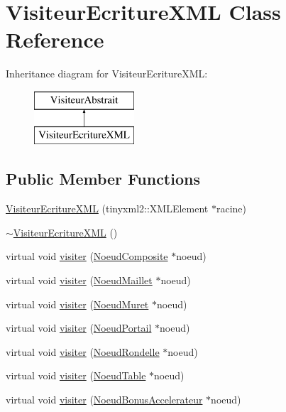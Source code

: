 \hypertarget{class_visiteur_ecriture_x_m_l}{}\section{Visiteur\+Ecriture\+X\+ML Class Reference}
\label{class_visiteur_ecriture_x_m_l}
Inheritance diagram for Visiteur\+Ecriture\+X\+ML\+:\begin{figure}[H]
\begin{center}
\leavevmode
\includegraphics[height=2.000000cm]{class_visiteur_ecriture_x_m_l}
\end{center}
\end{figure}
\subsection*{Public Member Functions}
\begin{DoxyCompactItemize}
\item 
\hyperlink{group__inf2990_ga603ad88ebfda35e755544b4914b074ca}{Visiteur\+Ecriture\+X\+ML} (tinyxml2\+::\+X\+M\+L\+Element $\ast$racine)
\item 
\hyperlink{group__inf2990_gadf7aaa7cf24b9db027fae1d7311e88f4}{$\sim$\+Visiteur\+Ecriture\+X\+ML} ()
\item 
virtual void \hyperlink{group__inf2990_ga7f22cab13593b84b8ce9a12f5a1ee20d}{visiter} (\hyperlink{class_noeud_composite}{Noeud\+Composite} $\ast$noeud)
\item 
virtual void \hyperlink{group__inf2990_ga03542b458767240b58f461c3d3b2a024}{visiter} (\hyperlink{class_noeud_maillet}{Noeud\+Maillet} $\ast$noeud)
\item 
virtual void \hyperlink{group__inf2990_gaea398607589ad92ffbf72fceebf3058c}{visiter} (\hyperlink{class_noeud_muret}{Noeud\+Muret} $\ast$noeud)
\item 
virtual void \hyperlink{group__inf2990_ga33c4411d6c8a5a4aa5de730e282d1b33}{visiter} (\hyperlink{class_noeud_portail}{Noeud\+Portail} $\ast$noeud)
\item 
virtual void \hyperlink{group__inf2990_ga56944b1a695729e789a8bdec7bec424f}{visiter} (\hyperlink{class_noeud_rondelle}{Noeud\+Rondelle} $\ast$noeud)
\item 
virtual void \hyperlink{group__inf2990_gaeb2a78298e8c18d34d1f9eee1920b419}{visiter} (\hyperlink{class_noeud_table}{Noeud\+Table} $\ast$noeud)
\item 
virtual void \hyperlink{group__inf2990_gaf4c4c56ab75e918739abbc00b274c938}{visiter} (\hyperlink{class_noeud_bonus_accelerateur}{Noeud\+Bonus\+Accelerateur} $\ast$noeud)
\end{DoxyCompactItemize}

